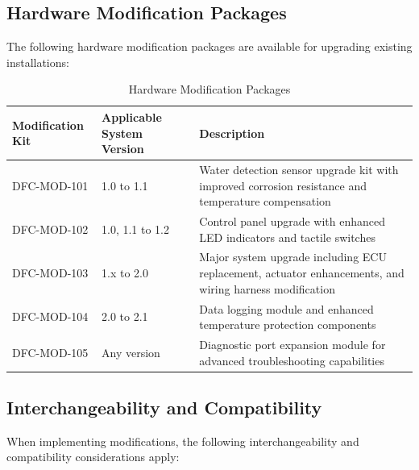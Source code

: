 \documentclass[12pt,a4paper,twoside,openright]{book}
\newcommand{\tabletextfont}{\normalfont\rmfamily}
\newcommand{\tableheadfont}{\normalfont\bfseries}
\begin{document}
\subsection{Hardware Modification Packages}

The following hardware modification packages are available for upgrading existing installations:

\begin{table}[h]
\centering
\setlength{\tabcolsep}{5pt} %
\begin{tabular}{|p{}|p{}|p{}|}
\hline
\tableheadfont\textbf{Modification Kit} & \tableheadfont\textbf{Applicable System Version} & \tableheadfont\textbf{Description} \\
\hline
\tabletextfont DFC-MOD-101 & 1.0 to 1.1 & Water detection sensor upgrade kit with improved corrosion resistance and temperature compensation \\
\hline
\tabletextfont DFC-MOD-102 & 1.0, 1.1 to 1.2 & Control panel upgrade with enhanced LED indicators and tactile switches \\
\hline
\tabletextfont DFC-MOD-103 & 1.x to 2.0 & Major system upgrade including ECU replacement, actuator enhancements, and wiring harness modification \\
\hline
\tabletextfont DFC-MOD-104 & 2.0 to 2.1 & Data logging module and enhanced temperature protection components \\
\hline
\tabletextfont DFC-MOD-105 & Any version & Diagnostic port expansion module for advanced troubleshooting capabilities \\
\hline
\end{tabular}
\caption{Hardware Modification Packages}
\end{table}

\subsection{Interchangeability and Compatibility}

When implementing modifications, the following interchangeability and compatibility considerations apply:
\end{document}
